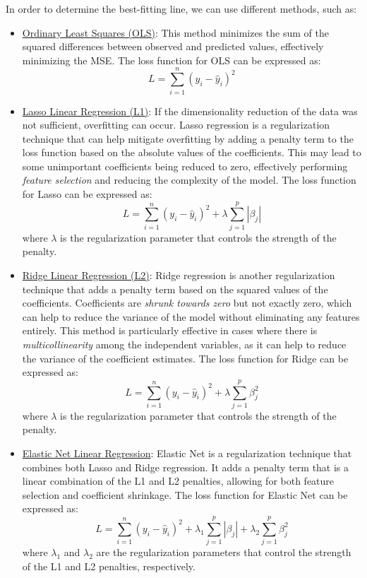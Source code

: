 In order to determine the best-fitting line, we can use different methods, such as:
\begin{itemize}
    \item \ul{Ordinary Least Squares (OLS)}: This method minimizes the sum of the squared differences between observed and predicted values, effectively minimizing the MSE. The loss function for OLS can be expressed as:
    \begin{equation*}
        L = \sum_{i=1}^{n} (y_i - \hat{y}_i)^2
    \end{equation*}

    \item \ul{Lasso Linear Regression (L1)}: If the dimensionality reduction of the data was not sufficient, overfitting can occur. Lasso regression is a regularization technique that can help mitigate overfitting by adding a penalty term to the loss function based on the absolute values of the coefficients. This may lead to some unimportant coefficients being reduced to zero, effectively performing \emph{feature selection} and {reducing the complexity of the model}. The loss function for Lasso can be expressed as:
    \begin{equation*}
        L = \sum_{i=1}^{n} (y_i - \hat{y}_i)^2 + \lambda \sum_{j=1}^{p} |\beta_j|
    \end{equation*}
    where $\lambda$ is the regularization parameter that controls the strength of the penalty.

    \item \ul{Ridge Linear Regression (L2)}: Ridge regression is another regularization technique that adds a penalty term based on the squared values of the coefficients. Coefficients are \emph{shrunk towards zero} but not exactly zero, which can help to reduce the variance of the model without eliminating any features entirely. This method is particularly effective in cases where there is \emph{multicollinearity} among the independent variables, as it can help to reduce the variance of the coefficient estimates. The loss function for Ridge can be expressed as:
    \begin{equation*}
        L = \sum_{i=1}^{n} (y_i - \hat{y}_i)^2 + \lambda \sum_{j=1}^{p} \beta_j^2
    \end{equation*}
    where $\lambda$ is the regularization parameter that controls the strength of the penalty.

    \item \ul{Elastic Net Linear Regression}: Elastic Net is a regularization technique that combines both Lasso and Ridge regression. It adds a penalty term that is a linear combination of the L1 and L2 penalties, allowing for both feature selection and coefficient shrinkage. The loss function for Elastic Net can be expressed as:
    \begin{equation*}
        L = \sum_{i=1}^{n} (y_i - \hat{y}_i)^2 + \lambda_1 \sum_{j=1}^{p} |\beta_j| + \lambda_2 \sum_{j=1}^{p} \beta_j^2
    \end{equation*}
    where $\lambda_1$ and $\lambda_2$ are the regularization parameters that control the strength of the L1 and L2 penalties, respectively.


\end{itemize}

